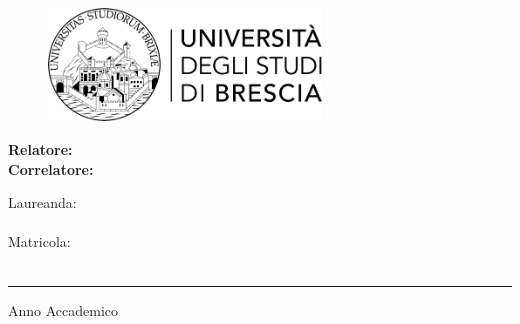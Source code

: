 \begin{titlepage}
    \begin{center}

        \begin{figure}[t]
            \centering
            \includegraphics[width=72.4mm,height=30mm]{template/LogoUniBS.png}    
        \end{figure}

        \vspace*{10mm}

        {\fontsize{17}{17}\selectfont
            \tesiDipartimento
        }

        \vspace*{10mm}

        {\fontsize{17}{17}\selectfont
            \tesiCdL
        }    

        \vspace*{20mm}

        {\fontsize{20}{20}\selectfont 
            \tesiTitolo
        }

    \end{center}

    \vfill

    \begin{flushleft}
        {\fontsize{17}{17}\selectfont 
            \textbf{Relatore:} \tesiRelatoreA\\
            \vspace{0,5cm}
            \textbf{Correlatore:} \tesiRelatoreB \\
        }

    \end{flushleft}

    \vspace*{5mm}

    \begin{flushright}
        {\fontsize{17}{17}\selectfont 
            Laureanda:\\
            \tesiStudente\\
            Matricola:\\
            \tesiMatricola\\
        }

    \end{flushright}


    \vspace*{5mm}

    \rule{0.8\textwidth}{0.4pt}
    \begin{center}
    {\fontsize{17}{17}\selectfont 
        Anno Accademico \tesiAA
    }
    \end{center}

\end{titlepage}
\restoregeometry

\leavevmode\thispagestyle{empty}\newpage